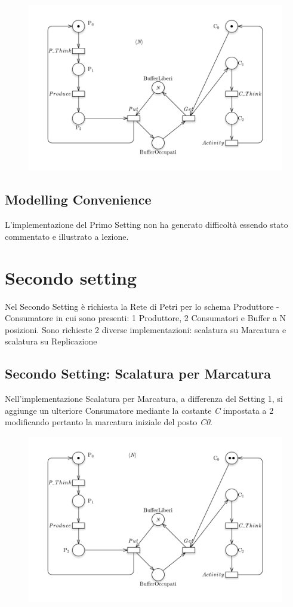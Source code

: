 \documentclass{article}
\begin{document}
\begin{figure}[h] 
\centering
\includegraphics[scale=0.3]{PT-Setting 1.png}
\end{figure}
\subsection{Modelling Convenience}
L'implementazione del Primo Setting non ha generato difficoltà essendo stato commentato e illustrato a lezione.
\clearpage
\section{Secondo  setting}
Nel Secondo Setting è richiesta la Rete di Petri per lo schema Produttore - Consumatore in cui sono presenti: 1 Produttore, 2 Consumatori e Buffer a N posizioni. Sono richieste 2 diverse implementazioni: scalatura su Marcatura e scalatura su Replicazione
\subsection{Secondo  Setting: Scalatura per Marcatura}
Nell'implementazione Scalatura per Marcatura, a differenza del Setting 1, si aggiunge un ulteriore Consumatore mediante la costante \textit{C} impostata a 2 modificando pertanto la marcatura iniziale del posto \textit{C0}. 
\begin{figure}[h] 
\centering
\includegraphics[scale=0.4]{setting2marcaturaPT.png}
\end{figure}
\end{document}
